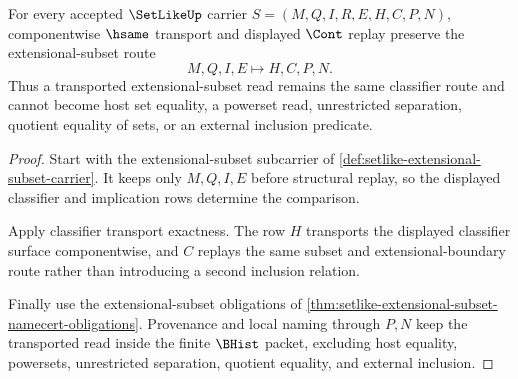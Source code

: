 \begin{theorem}
\label{thm:setlike-extensional-subset-transport}
For every accepted $\SetLikeUp$ carrier $S=(M,Q,I,R,E,H,C,P,N)$, componentwise $\hsame$ transport and displayed $\Cont$ replay preserve the extensional-subset route
$$
M,Q,I,E \longmapsto H,C,P,N .
$$
Thus a transported extensional-subset read remains the same classifier route and cannot become host set equality, a powerset read, unrestricted separation, quotient equality of sets, or an external inclusion predicate.
\end{theorem}
\begin{proof}
Start with the extensional-subset subcarrier of \autoref{def:setlike-extensional-subset-carrier}. It keeps only $M,Q,I,E$ before structural replay, so the displayed classifier and implication rows determine the comparison.

Apply classifier transport exactness. The row $H$ transports the displayed classifier surface componentwise, and $C$ replays the same subset and extensional-boundary route rather than introducing a second inclusion relation.

Finally use the extensional-subset obligations of \autoref{thm:setlike-extensional-subset-namecert-obligations}. Provenance and local naming through $P,N$ keep the transported read inside the finite $\BHist$ packet, excluding host equality, powersets, unrestricted separation, quotient equality, and external inclusion.
\end{proof}

